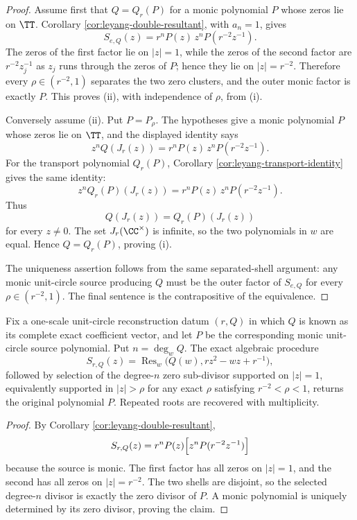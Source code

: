 \begin{proof}
Assume first that \(Q=Q_r(P)\) for a monic polynomial \(P\) whose zeros lie on \(\TT\).  Corollary \ref{cor:leyang-double-resultant}, with \(a_n=1\), gives
\[
S_{e,Q}(z)=r^nP(z)\,z^nP\!\left(r^{-2}z^{-1}\right).
\]
The zeros of the first factor lie on \(|z|=1\), while the zeros of the second factor are \(r^{-2}z_j^{-1}\) as \(z_j\) runs through the zeros of \(P\); hence they lie on \(|z|=r^{-2}\).  Therefore every \(\rho\in(r^{-2},1)\) separates the two zero clusters, and the outer monic factor is exactly \(P\).  This proves \textup{(ii)}, with independence of \(\rho\), from \textup{(i)}.

Conversely assume \textup{(ii)}.  Put \(P=P_\rho\).  The hypotheses give a monic polynomial \(P\) whose zeros lie on \(\TT\), and the displayed identity says
\[
z^nQ(J_r(z))=r^nP(z)\,z^nP(r^{-2}z^{-1}).
\]
For the transport polynomial \(Q_r(P)\), Corollary \ref{cor:leyang-transport-identity} gives the same identity:
\[
z^nQ_r(P)(J_r(z))=r^nP(z)\,z^nP(r^{-2}z^{-1}).
\]
Thus
\[
Q(J_r(z))=Q_r(P)(J_r(z))
\]
for every \(z\ne0\).  The set \(J_r(\CC^\times)\) is infinite, so the two polynomials in \(w\) are equal.  Hence \(Q=Q_r(P)\), proving \textup{(i)}.

The uniqueness assertion follows from the same separated-shell argument: any monic unit-circle source producing \(Q\) must be the outer factor of \(S_{e,Q}\) for every \(\rho\in(r^{-2},1)\).  The final sentence is the contrapositive of the equivalence.
\end{proof}

\begin{proposition}\label{prop:exact-shell-reconstruction}
Fix a one-scale unit-circle reconstruction datum \((r,Q)\) in which \(Q\) is known as its complete exact coefficient vector, and let \(P\) be the corresponding monic unit-circle source polynomial.  Put \(n=\deg_w Q\).  The exact algebraic procedure
\[
S_{r,Q}(z)=\operatorname{Res}_w\!\bigl(Q(w),rz^2-wz+r^{-1}\bigr),
\]
followed by selection of the degree-\(n\) zero sub-divisor supported on \(|z|=1\), equivalently supported in \(|z|>\rho\) for any exact \(\rho\) satisfying \(r^{-2}<\rho<1\), returns the original polynomial \(P\).  Repeated roots are recovered with multiplicity.
\end{proposition}

\begin{proof}
By Corollary \ref{cor:leyang-double-resultant},
\[
S_{r,Q}(z)=r^nP(z)\Bigl[z^nP(r^{-2}z^{-1})\Bigr]
\]
because the source is monic.  The first factor has all zeros on \(|z|=1\), and the second has all zeros on \(|z|=r^{-2}\).  The two shells are disjoint, so the selected degree-\(n\) divisor is exactly the zero divisor of \(P\).  A monic polynomial is uniquely determined by its zero divisor, proving the claim.
\end{proof}


